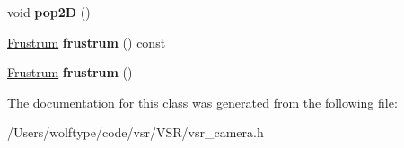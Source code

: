 \begin{DoxyCompactItemize}
\item 
\hypertarget{classvsr_1_1_camera_af6dca5ff5416faa02c33373df2ebeed3}{void {\bfseries pop2\-D} ()}\label{classvsr_1_1_camera_af6dca5ff5416faa02c33373df2ebeed3}

\item 
\hypertarget{classvsr_1_1_camera_a50bc2c532ddbf87fc7cfb0514eef8502}{\hyperlink{structvsr_1_1_frustrum}{Frustrum} {\bfseries frustrum} () const }\label{classvsr_1_1_camera_a50bc2c532ddbf87fc7cfb0514eef8502}

\item 
\hypertarget{classvsr_1_1_camera_a828217c5c3980f57d8640ff51fffc76a}{\hyperlink{structvsr_1_1_frustrum}{Frustrum} {\bfseries frustrum} ()}\label{classvsr_1_1_camera_a828217c5c3980f57d8640ff51fffc76a}

\end{DoxyCompactItemize}


The documentation for this class was generated from the following file\-:\begin{DoxyCompactItemize}
\item 
/\-Users/wolftype/code/vsr/\-V\-S\-R/vsr\-\_\-camera.\-h\end{DoxyCompactItemize}
